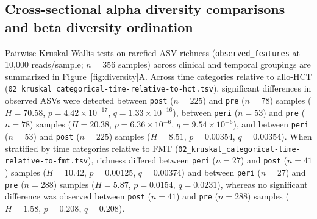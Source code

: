 \subsection{Cross-sectional alpha diversity comparisons and beta diversity ordination}
Pairwise Kruskal-Wallis tests on rarefied ASV richness (\texttt{observed\_features} at 10,000 reads/sample; $n = 356$ samples) across clinical and temporal groupings are summarized in Figure~\ref{fig:diversity}A. Across time categories relative to allo-HCT (\texttt{02\_kruskal\_categorical-time-relative-to-hct.tsv}), significant differences in observed ASVs were detected between \texttt{post} ($n = 225$) and \texttt{pre} ($n = 78$) samples ($H = 70.58$, $p = 4.42 \times 10^{-17}$, $q = 1.33 \times 10^{-16}$), between \texttt{peri} ($n = 53$) and \texttt{pre} ($n = 78$) samples ($H = 20.38$, $p = 6.36 \times 10^{-6}$, $q = 9.54 \times 10^{-6}$), and between \texttt{peri} ($n = 53$) and \texttt{post} ($n = 225$) samples ($H = 8.51$, $p = 0.00354$, $q = 0.00354$). When stratified by time categories relative to FMT (\texttt{02\_kruskal\_categorical-time-relative-to-fmt.tsv}), richness differed between \texttt{peri} ($n = 27$) and \texttt{post} ($n = 41$) samples ($H = 10.42$, $p = 0.00125$, $q = 0.00374$) and between \texttt{peri} ($n = 27$) and \texttt{pre} ($n = 288$) samples ($H = 5.87$, $p = 0.0154$, $q = 0.0231$), whereas no significant difference was observed between \texttt{post} ($n = 41$) and \texttt{pre} ($n = 288$) samples ($H = 1.58$, $p = 0.208$, $q = 0.208$).

